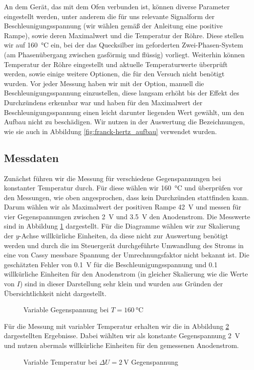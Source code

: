 \documentclass[11pt, a4paper]{article}
\begin{document}
An dem Gerät, das mit dem Ofen verbunden ist, können diverse Parameter eingestellt werden, unter anderem die für uns relevante Signalform der Beschleunigungsspannung (wir wählen gemäß der Anleitung eine positive Rampe), sowie deren Maximalwert und die Temperatur der Röhre.
Diese stellen wir auf \SI{160}{\degreeCelsius} ein, bei der das Quecksilber im geforderten Zwei-Phasen-System (am Phasenübergang zwischen gasförmig und flüssig) vorliegt.
Weiterhin können Temperatur der Röhre eingestellt und aktuelle Temperaturwerte überprüft werden, sowie einige weitere Optionen, die für den Versuch nicht benötigt wurden.
Vor jeder Messung haben wir mit der Option, manuell die Beschleunigungsspannung einzustellen, diese langsam erhöht bis der Effekt des Durchzündens erkennbar war und haben für den Maximalwert der Beschleunigungsspannung einen leicht darunter liegenden Wert gewählt, um den Aufbau nicht zu beschädigen.
Wir nutzen in der Auswertung die Bezeichnungen, wie sie auch in Abbildung \ref{fig:franck-hertz_aufbau} verwendet wurden.

\subsection{Messdaten}

Zunächst führen wir die Messung für verschiedene Gegenspannungen bei konstanter Temperatur durch.
Für diese wählen wir \SI{160}{\degreeCelsius} und überprüfen vor den Messungen, wie oben angesprochen, dass kein Durchzünden stattfinden kann.
Darum wählen wir als Maximalwert der positiven Rampe \SI{42}{\volt} und messen für vier Gegenspannungen zwischen \SI{2}{\volt} und \SI{3.5}{\volt} den Anodenstrom.
Die Messwerte sind in Abbildung \ref{fig:fh_varvolt} dargestellt.
Für die Diagramme wählen wir zur Skalierung der $y$-Achse willkürliche Einheiten, da diese nicht zur Auswertung benötigt werden und durch die im Steuergerät durchgeführte Umwandlung des Stroms in eine von Cassy messbare Spannung der Umrechnungsfaktor nicht bekannt ist.
Die geschätzten Fehler von \SI{0.1}{\volt} für die Beschleunigungsspannung und \num{0.1} willkürliche Einheiten für den Anodenstrom (in gleicher Skalierung wie die Werte von $I$) sind in dieser Darstellung sehr klein und wurden aus Gründen der Übersichtlichkeit nicht dargestellt.
\begin{figure}[!h]
\centering

\caption{Variable Gegenspannung bei $T=\SI{160}{\degreeCelsius}$}
\label{fig:fh_varvolt}
\end{figure}
Für die Messung mit variabler Temperatur erhalten wir die in Abbildung \ref{fig:fh_vartemp} dargestellten Ergebnisse.
Dabei wählten wir als konstante Gegenspannung \SI{2}{\volt} und nutzen abermals willkürliche Einheiten für den gemessenen Anodenstrom.
\begin{figure}[!h]
\centering

\caption{Variable Temperatur bei $\Delta U=\SI{2}{\volt}$ Gegenspannung}
\label{fig:fh_vartemp}
\end{figure}
\end{document}

